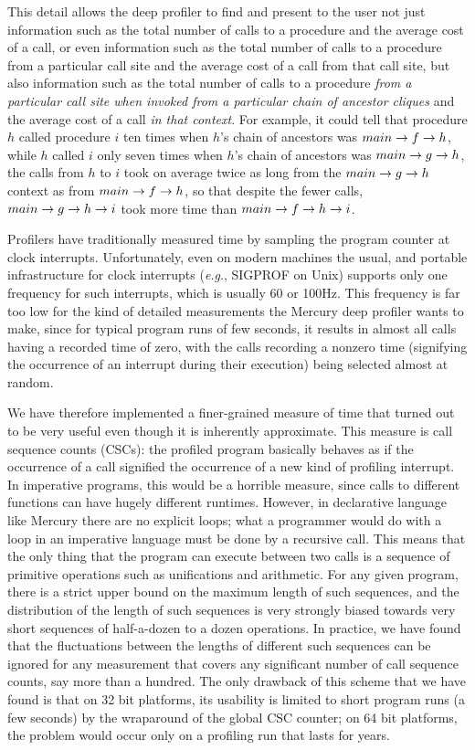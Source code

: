 This detail allows the deep profiler to find and present to the user
not just information such as the total number of calls to a procedure
and the average cost of a call,
or even information such as the total number of calls to a procedure
from a particular call site and the average cost of a call from that call site,
but also information such as the total number of calls to a procedure
\emph{from a particular call site
when invoked from a particular chain of ancestor cliques}
and the average cost of a call \emph{in that context}.
For example, it could tell that
procedure $h$ called procedure $i$ ten times
when $h$'s chain of ancestors was $main \rightarrow f \rightarrow h$,
while $h$ called $i$ only seven times
when $h$'s chain of ancestors was $main \rightarrow g \rightarrow h$,
the calls from $h$ to $i$ took on average twice as long
from the $main \rightarrow g \rightarrow h$ context as from $main \rightarrow f \rightarrow h$,
so that despite the fewer calls,
$main \rightarrow g \rightarrow h \rightarrow i$ took more time than $main \rightarrow f \rightarrow h \rightarrow i$.

Profilers have traditionally measured time
by sampling the program counter at clock interrupts.
Unfortunately, even on modern machines
the usual, and portable infrastructure for clock interrupts
(\emph{e.g}., SIGPROF on Unix)
supports only one frequency for such interrupts,
which is usually 60 or 100Hz.
This frequency is far too low for the kind of detailed measurements
the Mercury deep profiler wants to make,
since for typical program runs of few seconds,
it results in almost all calls having a recorded time of zero,
with the calls recording a nonzero time
(signifying the occurrence of an interrupt during their execution)
being selected almost at random.

We have therefore implemented a finer-grained measure of time
that turned out to be very useful
even though it is inherently approximate.
This measure is call sequence counts (CSCs):
the profiled program basically behaves
as if the occurrence of a call signified
the occurrence of a new kind of profiling interrupt.
In imperative programs, this would be a horrible measure,
since calls to different functions can have hugely different runtimes.
However, in declarative language like Mercury there are no explicit loops;
what a programmer would do with a loop in an imperative language
must be done by a recursive call.
This means that the only thing that the program can execute between two calls
is a sequence of primitive operations such as unifications and arithmetic.
For any given program,
there is a strict upper bound on the maximum length of such sequences,
and the distribution of the length of such sequences
is very strongly biased towards very short sequences
of half-a-dozen to a dozen operations.
In practice, we have found that
the fluctuations between the lengths of different such sequences
can be ignored for any measurement
that covers any significant number of call sequence counts,
say more than a hundred.
The only drawback of this scheme that we have found
is that on 32 bit platforms,
its usability is limited to short program runs (a few seconds)
by the wraparound of the global CSC counter;
on 64 bit platforms, the problem would occur
only on a profiling run that lasts for years.


